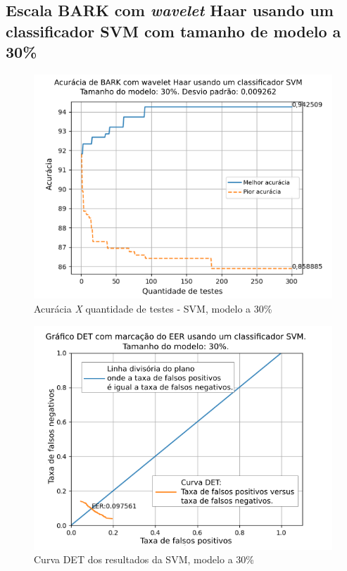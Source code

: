 \subsection{Escala BARK com \textit{wavelet} Haar usando um classificador SVM com tamanho de modelo a 30\%}


\begin{figure}[ht]
	\centering
	\includegraphics[width=\linewidth]{images/results/confusionMatrices/classifier_SVM_30.png}
	\caption{Acurácia \textit{X} quantidade de testes - SVM, modelo a 30\%}
	\label{fig:classifiersvm30}
\end{figure}

\begin{figure}[h]
	\centering
	\includegraphics[width=\linewidth]{images/results/det/DET_SVM_30}
	\caption{Curva DET dos resultados da SVM, modelo a 30\%}
	\label{fig:detsvm30}
\end{figure}

